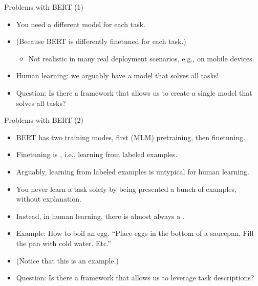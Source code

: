 \begin{frame}{Problems with BERT (1)}

\vfill

  \begin{itemize}
\item You need a different model for each task.
\item (Because BERT is differently finetuned for each task.)
  \begin{itemize}
\item Not realistic in many real deployment
scenarios, e.g., on mobile devices.
    \end{itemize}
\item Human learning: we arguably have a
 model that solves all tasks!
\item Question: Is there a framework that allows us to
create a single model that solves all tasks?
    \end{itemize}

\vfill

\end{frame}


\begin{frame}{Problems with BERT (2)}

\vfill
			
\begin{itemize}
\item BERT has two training modes, first (MLM)
pretraining, then finetuning.
\item Finetuning is ,
i.e., learning from labeled examples.
\item Arguably, learning from labeled examples is
untypical for human learning.
\item You never learn a task solely by being presented
a bunch of examples, without explanation.
\item Instead, in human learning, there is almost
always a .
\item Example: How to boil an egg.
``Place eggs in the bottom of a saucepan. Fill the pan with
cold water. Etc.''
\item  (Notice that this is  an example.)
\item Question: Is there a framework that allows us to
leverage task descriptions?
\end{itemize}

\vfill

\end{frame}

